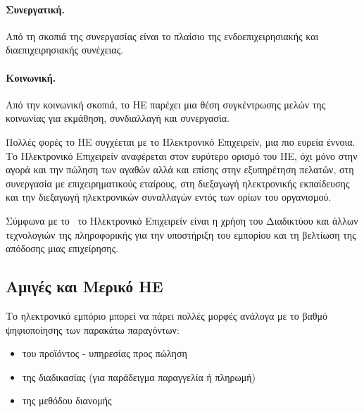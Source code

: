 \documentclass[12pt]{report}
\begin{document}
  \paragraph{Συνεργατική.} Από τη σκοπιά της συνεργασίας είναι το πλαίσιο της ενδοεπιχειρησιακής και διαεπιχειρησιακής συνέχειας.
  \paragraph{Κοινωνική.} Από την κοινωνική σκοπιά, το ΗΕ παρέχει μια θέση συγκέντρωσης μελών της κοινωνίας για εκμάθηση, συνδιαλλαγή και συνεργασία.

Πολλές φορές το ΗΕ συγχέεται με το Ηλεκτρονικό Επιχειρείν, μια πιο ευρεία έννοια. Το Ηλεκτρονικό Επιχειρείν αναφέρεται στον ευρύτερο ορισμό του ΗΕ, όχι μόνο στην αγορά και την πώληση των αγαθών αλλά και επίσης στην εξυπηρέτηση πελατών, στη συνεργασία με επιχειρηματικούς εταίρους, στη διεξαγωγή ηλεκτρονικής εκπαίδευσης και την διεξαγωγή ηλεκτρονικών συναλλαγών εντός των ορίων του οργανισμού.

Σύμφωνα με το~\cite{chen_2005} το Ηλεκτρονικό Επιχειρείν είναι η χρήση του Διαδικτύου και άλλων τεχνολογιών της πληροφορικής για την υποστήριξη του εμπορίου και τη βελτίωση της απόδοσης μιας επιχείρησης.

\subsection{Αμιγές και Μερικό ΗΕ}
Το ηλεκτρονικό εμπόριο μπορεί να πάρει πολλές μορφές ανάλογα με το βαθμό ψηφιοποίησης των παρακάτω παραγόντων:
\begin{itemize}
  \item του προϊόντος - υπηρεσίας προς πώληση
  \item της διαδικασίας (για παράδειγμα παραγγελία ή πληρωμή)
  \item της μεθόδου διανομής
\end{itemize}
\end{document}

